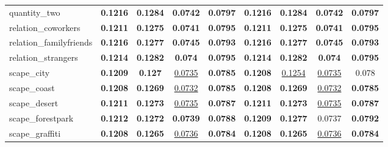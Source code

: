 \begin{center}
\begin{supertabular}{lcccc||cccc}
\small{quantity\_two} & \textbf{\scriptsize{0.1216}} & \textbf{\scriptsize{0.1284}} & \textbf{\scriptsize{0.0742}} & \textbf{\scriptsize{0.0797}}& \textbf{\scriptsize{0.1216}} & \textbf{\scriptsize{0.1284}} & \textbf{\scriptsize{0.0742}} & \textbf{\scriptsize{0.0797}}\\
\small{relation\_coworkers} & \textbf{\scriptsize{0.1211}} & \textbf{\scriptsize{0.1275}} & \textbf{\scriptsize{0.0741}} & \textbf{\scriptsize{0.0795}}& \textbf{\scriptsize{0.1211}} & \textbf{\scriptsize{0.1275}} & \textbf{\scriptsize{0.0741}} & \textbf{\scriptsize{0.0795}}\\
\small{relation\_familyfriends} & \textbf{\scriptsize{0.1216}} & \textbf{\scriptsize{0.1277}} & \textbf{\scriptsize{0.0745}} & \textbf{\scriptsize{0.0793}}& \textbf{\scriptsize{0.1216}} & \textbf{\scriptsize{0.1277}} & \textbf{\scriptsize{0.0745}} & \textbf{\scriptsize{0.0793}}\\
\small{relation\_strangers} & \textbf{\scriptsize{0.1214}} & \textbf{\scriptsize{0.1282}} & \textbf{\scriptsize{0.074}} & \textbf{\scriptsize{0.0795}}& \textbf{\scriptsize{0.1214}} & \textbf{\scriptsize{0.1282}} & \textbf{\scriptsize{0.074}} & \textbf{\scriptsize{0.0795}}\\
\small{scape\_city} & \textbf{\scriptsize{0.1209}} & \textbf{\scriptsize{0.127}} & \underline{\scriptsize{0.0735}} & \textbf{\scriptsize{0.0785}}& \textbf{\scriptsize{0.1208}} & \underline{\scriptsize{0.1254}} & \underline{\scriptsize{0.0735}} & {\scriptsize{0.078}}\\
\small{scape\_coast} & \textbf{\scriptsize{0.1208}} & \textbf{\scriptsize{0.1269}} & \underline{\scriptsize{0.0732}} & \textbf{\scriptsize{0.0785}}& \textbf{\scriptsize{0.1208}} & \textbf{\scriptsize{0.1269}} & \underline{\scriptsize{0.0732}} & \textbf{\scriptsize{0.0785}}\\
\small{scape\_desert} & \textbf{\scriptsize{0.1211}} & \textbf{\scriptsize{0.1273}} & \underline{\scriptsize{0.0735}} & \textbf{\scriptsize{0.0787}}& \textbf{\scriptsize{0.1211}} & \textbf{\scriptsize{0.1273}} & \underline{\scriptsize{0.0735}} & \textbf{\scriptsize{0.0787}}\\
\small{scape\_forestpark} & \textbf{\scriptsize{0.1212}} & \textbf{\scriptsize{0.1272}} & \textbf{\scriptsize{0.0739}} & \textbf{\scriptsize{0.0788}}& \textbf{\scriptsize{0.1209}} & \textbf{\scriptsize{0.1277}} & {\scriptsize{0.0737}} & \textbf{\scriptsize{0.0792}}\\
\small{scape\_graffiti} & \textbf{\scriptsize{0.1208}} & \textbf{\scriptsize{0.1265}} & \underline{\scriptsize{0.0736}} & \textbf{\scriptsize{0.0784}}& \textbf{\scriptsize{0.1208}} & \textbf{\scriptsize{0.1265}} & \underline{\scriptsize{0.0736}} & \textbf{\scriptsize{0.0784}}\\

\end{supertabular}
\end{center}
